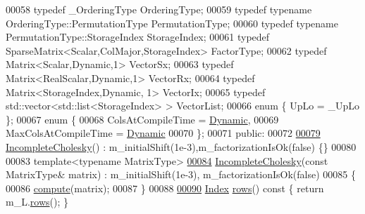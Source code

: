\begin{DoxyCode}
00058     \textcolor{keyword}{typedef} \_OrderingType OrderingType;
00059     \textcolor{keyword}{typedef} \textcolor{keyword}{typename} OrderingType::PermutationType PermutationType;
00060     \textcolor{keyword}{typedef} \textcolor{keyword}{typename} PermutationType::StorageIndex StorageIndex; 
00061     \textcolor{keyword}{typedef} SparseMatrix<Scalar,ColMajor,StorageIndex> FactorType;
00062     \textcolor{keyword}{typedef} Matrix<Scalar,Dynamic,1> VectorSx;
00063     \textcolor{keyword}{typedef} Matrix<RealScalar,Dynamic,1> VectorRx;
00064     \textcolor{keyword}{typedef} Matrix<StorageIndex,Dynamic, 1> VectorIx;
00065     \textcolor{keyword}{typedef} std::vector<std::list<StorageIndex> > VectorList; 
00066     \textcolor{keyword}{enum} \{ UpLo = \_UpLo \};
00067     \textcolor{keyword}{enum} \{
00068       ColsAtCompileTime = \hyperlink{namespace_eigen_ad81fa7195215a0ce30017dfac309f0b2}{Dynamic},
00069       MaxColsAtCompileTime = \hyperlink{namespace_eigen_ad81fa7195215a0ce30017dfac309f0b2}{Dynamic}
00070     \};
00071   \textcolor{keyword}{public}:
00072 
\hyperlink{class_eigen_1_1_incomplete_cholesky_adaaa3975b8cf53f910d6a3344af92379}{00079}     \hyperlink{class_eigen_1_1_incomplete_cholesky_adaaa3975b8cf53f910d6a3344af92379}{IncompleteCholesky}() : m\_initialShift(1e-3),m\_factorizationIsOk(false) \{\}
00080     
00083     \textcolor{keyword}{template}<\textcolor{keyword}{typename} MatrixType>
\hyperlink{class_eigen_1_1_incomplete_cholesky_a757499fc814988a5b112b1f34d0295e1}{00084}     \hyperlink{class_eigen_1_1_incomplete_cholesky_a757499fc814988a5b112b1f34d0295e1}{IncompleteCholesky}(\textcolor{keyword}{const} MatrixType& matrix) : m\_initialShift(1e-3),
      m\_factorizationIsOk(false)
00085     \{
00086       \hyperlink{class_eigen_1_1_incomplete_cholesky_a7966bedeebbeaa7a8fe4dd1da3797a0b}{compute}(matrix);
00087     \}
00088     
\hyperlink{class_eigen_1_1_incomplete_cholesky_a4780a83266c871782595081021268b5a}{00090}     \hyperlink{namespace_eigen_a62e77e0933482dafde8fe197d9a2cfde}{Index} \hyperlink{class_eigen_1_1_incomplete_cholesky_a4780a83266c871782595081021268b5a}{rows}()\textcolor{keyword}{ const }\{ \textcolor{keywordflow}{return} m\_L.\hyperlink{group___sparse_core___module_a62e61bb861eee306d5b069ce652b5aa5}{rows}(); \}

\end{DoxyCode}
